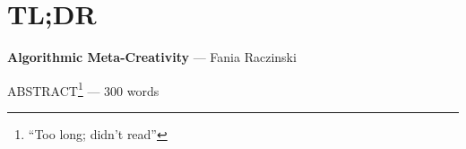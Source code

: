 
\pagestyle{empty}

\chapter{TL;DR}
\label{abstract}

{\Large \textbf{Algorithmic Meta-Creativity}} --- Fania Raczinski

\vspace{0.5cm}
ABSTRACT\footnote{``Too long; didn't read''} --- 300 words

\lipsum[1-2]


\clearpage
